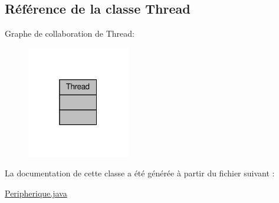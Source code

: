 \hypertarget{class_thread}{}\subsection{Référence de la classe Thread}
\label{class_thread}


Graphe de collaboration de Thread\+:
\nopagebreak
\begin{figure}[H]
\begin{center}
\leavevmode
\includegraphics[width=127pt]{class_thread__coll__graph}
\end{center}
\end{figure}


La documentation de cette classe a été générée à partir du fichier suivant \+:\begin{DoxyCompactItemize}
\item 
\hyperlink{_peripherique_8java}{Peripherique.\+java}\end{DoxyCompactItemize}
